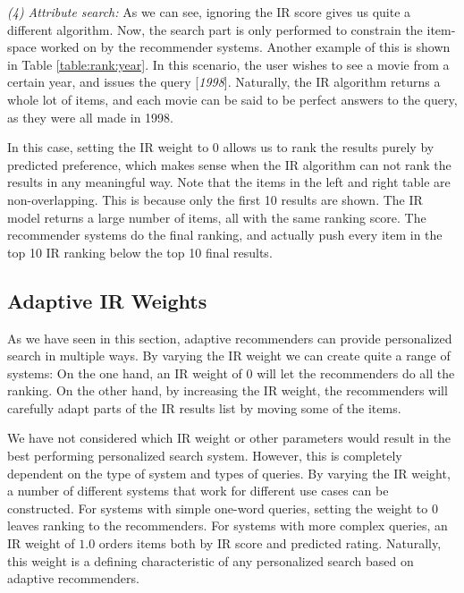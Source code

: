 \emph{(4) Attribute search:} 
As we can see, ignoring the IR score gives us quite a different algorithm.
Now, the search part is only performed to constrain the item-space worked
on by the recommender systems.
Another example of this is shown in Table \ref{table:rank:year}.
In this scenario, the user wishes to see a movie from a certain year,
and issues the query [\emph{1998}].
Naturally, the IR algorithm returns a whole lot of items, and each movie can
be said to be perfect answers to the query, as they were all made in 1998.

In this case, setting the IR weight to $0$ allows us to rank the results
purely by predicted preference, which makes sense when the IR algorithm
can not rank the results in any meaningful way.
Note that the items in the left and right table are non-overlapping.
This is because only the first 10 results are shown.
The IR model returns a large number of items,
all with the same ranking score.
The recommender systems do the final ranking, and actually
push every item in the top 10 IR ranking 
below the top 10 final results.




\clearpage
\subsection{Adaptive IR Weights}

As we have seen in this section, adaptive recommenders can provide personalized search
in multiple ways. 
By varying the IR weight we can create quite a range of systems:
On the one hand, an IR weight of 0 will let the recommenders do all the ranking.
On the other hand, by increasing the IR weight, the recommenders will carefully
adapt parts of the IR results list by moving some of the items.

We have not considered which IR weight or other parameters would result in the best performing
personalized search system.
However, this is completely dependent on the type of system and types of queries.
By varying the IR weight, a number of different systems that work for different use cases
can be constructed. For systems with simple one-word queries, setting the weight
to $0$ leaves ranking to the recommenders.
For systems with more complex queries, an IR weight of $1.0$ 
orders items both by IR score and predicted rating.
Naturally, this weight is a defining characteristic of any 
personalized search based on adaptive recommenders.

